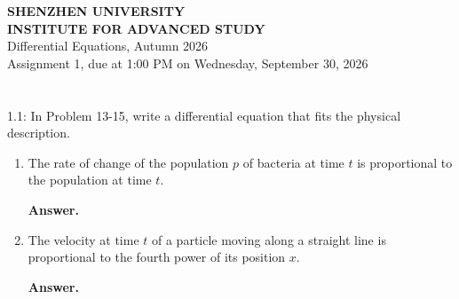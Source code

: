 \documentclass[11pt]{article}
\newenvironment{Question}{%
  \par\noindent\textbf{Answer.}\quad\ignorespaces
}{%
  \par\medskip
}
\begin{document}
\begin{center}
    \textbf{SHENZHEN UNIVERSITY} \\
    \textbf{INSTITUTE FOR ADVANCED STUDY} \\
    Differential Equations, Autumn 2026 \\
    Assignment 1, due at 1:00 PM on Wednesday, September 30, 2026
\end{center}
\section*{}
1.1: In Problem 13-15, write a differential equation that fits the physical description.
\begin{enumerate}
  \item[13.] The rate of change of the population $p$ of bacteria at time $t$ is proportional to the population at time $t$.
  \begin{Question}
  \end{Question}

  \item[14.] The velocity at time $t$ of a particle moving along a straight line is proportional to the fourth power of its position $x$.
  \begin{Question}
  \end{Question}
\end{enumerate}
\end{document}
